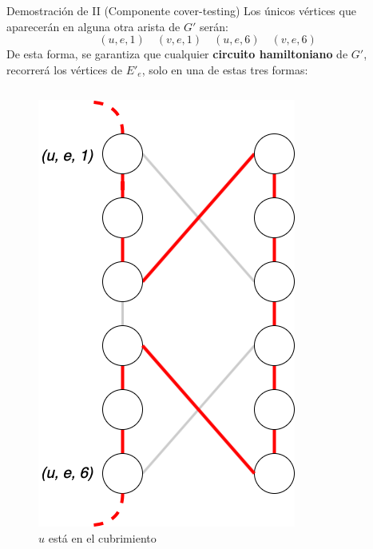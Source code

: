 \documentclass{beamer}
\begin{document}
\begin{frame}{Demostración de II (Componente cover-testing)}
    Los únicos vértices que aparecerán en alguna otra arista de $G'$ serán:
    \[(u,e,1) \quad (v,e,1) \quad (u,e,6) \quad (v,e,6)\]
    De esta forma, se garantiza que cualquier \textbf{circuito hamiltoniano} de $G'$,
    recorrerá los vértices de $E'_e$, solo en una de estas tres formas:
    \begin{columns}
        \begin{figure}
            \centering
            \includegraphics[scale=0.2]{images/cover-testing-3.png}
            \caption{$u$ está en el cubrimiento}
            \label{fig:my_label}
        \end{figure}
        

\end{columns}
\end{frame}
\end{document}
